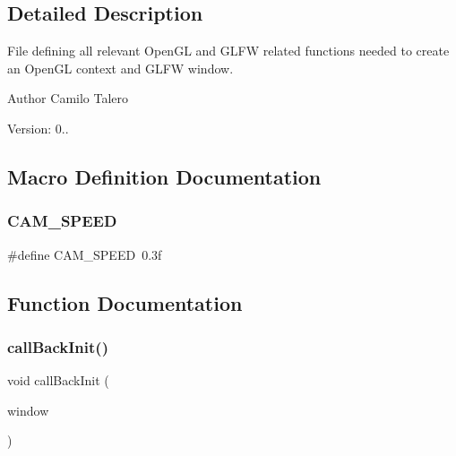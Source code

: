 \subsection{Detailed Description}
File defining all relevant Open\+GL and G\+L\+FW related functions needed to create an Open\+GL context and G\+L\+FW window. 

\begin{DoxyAuthor}{Author}
Camilo Talero
\end{DoxyAuthor}
Version\+: 0.. 

\subsection{Macro Definition Documentation}
\mbox{\label{Window-Management_8cpp_ab91512fde255a648fe16920b3d94911b}} 
\subsubsection{\texorpdfstring{C\+A\+M\+\_\+\+S\+P\+E\+ED}{CAM\_SPEED}}
{\footnotesize\ttfamily \#define C\+A\+M\+\_\+\+S\+P\+E\+ED~0.\+3f}



\subsection{Function Documentation}
\mbox{\label{Window-Management_8cpp_a49a5ff4f2fc2d79e62443424b32433ec}} 
\subsubsection{\texorpdfstring{call\+Back\+Init()}{callBackInit()}}
{\footnotesize\ttfamily void call\+Back\+Init (\begin{DoxyParamCaption}\item[{G\+L\+F\+Wwindow $\ast$}]{window }\end{DoxyParamCaption})}

